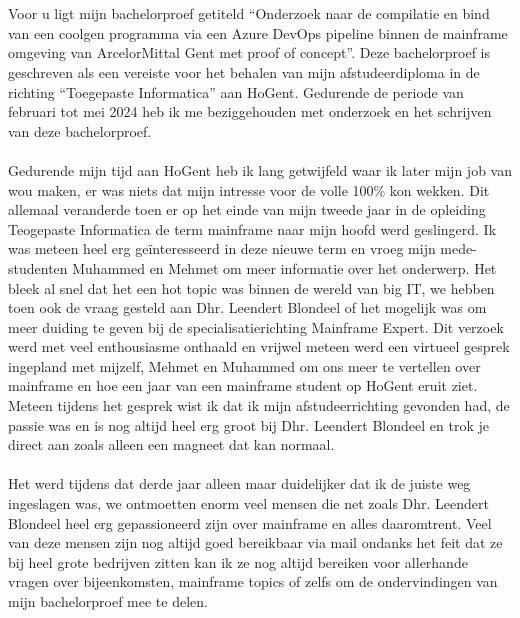
\chapter*{}%
\label{ch:voorwoord}

Voor u ligt mijn bachelorproef getiteld \enquote{Onderzoek naar de compilatie en bind van een coolgen programma via een Azure DevOps pipeline binnen de mainframe omgeving van ArcelorMittal Gent met proof of concept}. 
Deze bachelorproef is geschreven als een vereiste voor het behalen van mijn afstudeerdiploma in de richting \enquote{Toegepaste Informatica} aan HoGent.
Gedurende de periode van februari tot mei 2024 heb ik me beziggehouden met onderzoek en het schrijven van deze bachelorproef. 
\\ \\
Gedurende mijn tijd aan HoGent heb ik lang getwijfeld waar ik later mijn job van wou maken, er was niets dat mijn intresse voor de volle 100\% kon wekken. 
Dit allemaal veranderde toen er op het einde van mijn tweede jaar in de opleiding Teogepaste Informatica de term mainframe naar mijn hoofd werd geslingerd. 
Ik was meteen heel erg geïnteresseerd in deze nieuwe term en vroeg mijn mede-studenten Muhammed en Mehmet om meer informatie over het onderwerp. 
Het bleek al snel dat het een hot topic was binnen de wereld van big IT, we hebben toen ook de vraag gesteld aan Dhr. Leendert Blondeel of het mogelijk was om meer duiding te geven bij de specialisatierichting Mainframe Expert. 
Dit verzoek werd met veel enthousiasme onthaald en vrijwel meteen werd een virtueel gesprek ingepland met mijzelf, Mehmet en Muhammed om ons meer te vertellen over mainframe en hoe een jaar van een mainframe student op HoGent eruit ziet.
Meteen tijdens het gesprek wist ik dat ik mijn afstudeerrichting gevonden had, de passie was en is nog altijd heel erg groot bij Dhr. Leendert Blondeel en trok je direct aan zoals alleen een magneet dat kan normaal. 
\\ \\
Het werd tijdens dat derde jaar alleen maar duidelijker dat ik de juiste weg ingeslagen was, we ontmoetten enorm veel mensen die net zoals Dhr. Leendert Blondeel heel erg gepassioneerd zijn over mainframe en alles daaromtrent. 
Veel van deze mensen zijn nog altijd goed bereikbaar via mail ondanks het feit dat ze bij heel grote bedrijven zitten kan ik ze nog altijd bereiken voor allerhande vragen over bijeenkomsten, mainframe topics of zelfs om de ondervindingen van mijn bachelorproef mee te delen. 
